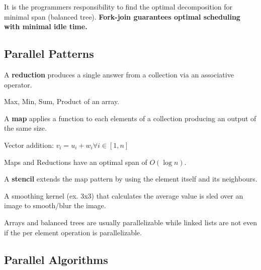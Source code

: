 \begin{remark}
It is the programmers responsibility to find the optimal decomposition for minimal span (balanced tree). \textbf{Fork-join guarantees optimal scheduling with minimal idle time.}
\end{remark}

\subsection{Parallel Patterns}

\begin{definition}
A \textbf{reduction} produces a single answer from a collection via an associative operator.
\end{definition}

\begin{example}
Max, Min, Sum, Product of an array.
\end{example}

\begin{definition}
A \textbf{map} applies a function to each elements of a collection producing an output of the same size.
\end{definition}

\begin{example}
Vector addition: $v_i = u_i + w_i \forall i \in [1, n]$
\end{example}

\begin{remark}
Maps and Reductions have an optimal span of $O(\log n)$.
\end{remark}

\begin{definition}
A \textbf{stencil} extends the map pattern by using the element itself and its neighbours.  
\end{definition}

\begin{example}
A smoothing kernel (ex. 3x3) that calculates the average value is sled over an image to smooth/blur the image.
\end{example}

\begin{remark}
Arrays and balanced trees are usually parallelizable while linked lists are not even if the per element operation is parallelizable.
\end{remark}

\subsection{Parallel Algorithms}

